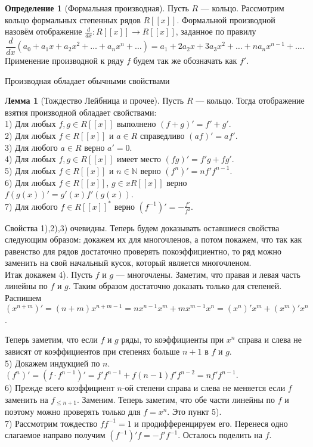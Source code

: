 \documentclass[10pt,a4paper,oneside]{book}
\theoremstyle{definition}
\newtheorem{defn}{Определение}
\newtheorem{lem}{Лемма}
\newcommand{\mb}[1]{\mathbb{#1}}
\def\dfn{\begin{defn}}
\def\edfn{\end{defn}}
\def\lm{\begin{lem}}
\def\elm{\end{lem}}
\begin{document}
\dfn[Формальная производная] Пусть $R$ --- кольцо. Рассмотрим кольцо формальных степенных рядов $R[[x]]$. Формальной производной назовём отображение
$\frac{d}{dx}\colon R[[x]]\to R[[x]]$, заданное по правилу
$$\frac{d}{dx}(a_0+a_1x+a_2x^2+\dots+a_nx^n+\dots) = a_1+2a_2x+3a_3x^2+\dots+na_nx^{n-1}+\dots.$$
Применение производной к ряду $f$ будем так же обозначать как $f'$.
\edfn



Производная обладает обычными свойствами
\lm[Тождество Лейбница и прочее] Пусть $R$ --- кольцо. Тогда отображение взятия производной обладает свойствами:\\
1) Для любых $f,g\in R[[x]]$ выполнено $(f+g)' = f'+g'$.\\
2) Для любых $f\in R[[x]]$ и $a\in R$ справедливо $(af)' = af'$.\\
3) Для любого $a\in R$ верно  $a'= 0$.\\
4) Для любых $f,g\in R[[x]]$ имеет место $(fg)' = f'g+fg'$.\\
5) Для любых $f\in R[[x]]$ и $n\in \mb N$ верно $ (f^n)' = nf'f^{n-1}$.\\
6) Для любых $f\in R[[x]]$, $g\in xR[[x]]$ верно $f(g(x))' = g'(x)f'(g(x))$.\\
7) Для любого $f\in R[[x]]^*$ верно $(f^{-1})'=-\frac{f'}{f^2}$.
\elm
\proof Свойства 1),2),3) очевидны. Теперь будем доказывать оставшиеся свойства следующим образом: докажем их для многочленов, а потом покажем, что так как равенство для рядов достаточно проверять  покоэффициентно, то ряд можно заменить на свой начальный кусок, который является многочленом.\\
Итак докажем 4). Пусть $f$ и $g$ --- многочлены. Заметим, что правая и левая часть линейны по $f$ и $g$. Таким образом достаточно доказать только для степеней. Распишем $(x^{n+m})'=(n+m)x^{n+m-1}=nx^{n-1}x^{m}+mx^{m-1}x^n=(x^n)'x^m+(x^{m})'x^n$.

Теперь заметим, что если $f$ и $g$ ряды, то коэффициенты при $x^n$ справа и слева не зависят от коэффициентов при степенях больше $n+1$ в $f$ и $g$. \\
5) Докажем индукцией по $n$. $(f^n)'=(f\cdot f^{n-1})'=f'f^{n-1}+f(n-1)f'f^{n-2}=nf'f^{n-1}$.\\
6) Прежде всего коэффициент $n$-ой степени справа и слева не меняется если $f$ заменить на $f_{\leq n+1}$. Заменим. Теперь заметим, что обе части линейны по $f$ и поэтому можно проверять только для $f=x^n$. Это пункт 5).\\
7) Рассмотрим тождество $ff^{-1}=1$ и продифференцируем его. Перенеся одно слагаемое направо получим $(f^{-1})'f=-f'f^{-1}$. Осталось поделить на $f$. 
\endproof
\end{document}
